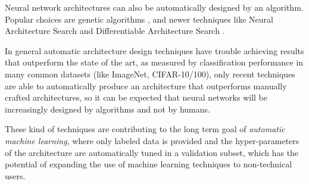 Neural network architectures can also be automatically designed by an algorithm. Popular choices are genetic algorithms \cite[-4em]{stanley2002evolving}, and newer techniques like Neural Architecture Search \cite[1em]{zoph2018learning} and Differentiable Architecture Search \cite[1em]{liu2018darts}.

In general automatic architecture design techniques have trouble achieving results that outperform the state of the art, as measured by classification performance in many common datasets (like ImageNet, CIFAR-10/100), only recent techniques are able to automatically produce an architecture that outperforms manually crafted architectures, so it can be expected that neural networks will be increasingly designed by algorithms and not by humans.

These kind of techniques are contributing to the long term goal of \textit{automatic machine learning}\cite[1em]{quanming2018taking}, where only labeled data is provided and the hyper-parameters of the architecture are automatically tuned in a validation subset, which has the potential of expanding the use of machine learning techniques to non-technical users.